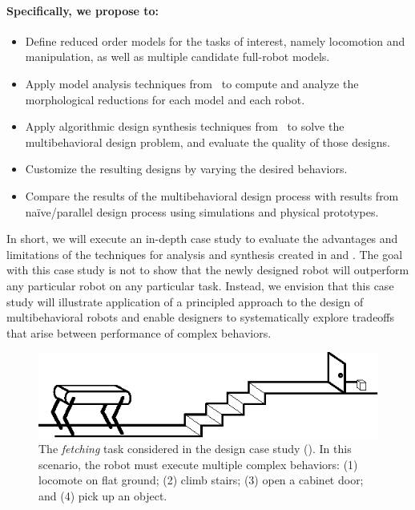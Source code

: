 \documentclass[11pt]{article}
\begin{document}
\paragraph{Specifically, we propose to:}
\begin{itemize}[leftmargin=1.5cm]
    \item[\T{3.1}] Define reduced order models for the tasks of interest, namely locomotion and manipulation, as well as multiple candidate full-robot models.
    \item[\T{3.2}] Apply model analysis techniques from~ to compute and analyze the morphological reductions for each model and each robot.
    \item[\T{3.3}] Apply algorithmic design synthesis techniques from~ to solve the multibehavioral design problem, and evaluate the quality of those designs.
    \item[\T{3.4}] Customize the resulting designs by varying the desired behaviors. 
    \item Compare the results of the multibehavioral design process with results from na{\"{i}}ve/parallel design process using simulations and physical prototypes.
\end{itemize}
In short, we will execute an in-depth case study to evaluate the advantages and limitations of the techniques for analysis and synthesis created in  and . 
The goal with this case study is not to show that the newly designed robot will outperform any particular robot on any particular task. 
Instead, we envision that this case study will illustrate application of a principled approach to the design of multibehavioral robots and enable designers to systematically explore tradeoffs that arise between performance of complex behaviors. 


\begin{figure}[t]
    \vspace{1em}
    \centering
    \includegraphics[width=0.9\columnwidth]{task.eps}
    \vspace{1em}
\caption{The \emph{fetching} task considered in the design case study (). 
In this scenario, the robot must execute multiple complex behaviors:
(1) locomote on flat ground; 
(2) climb stairs; 
(3) open a cabinet door; 
and 
(4) pick up an object.
}
    \label{fig:task}
\end{figure}
\end{document}
